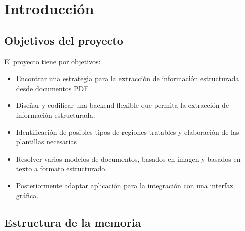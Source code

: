 
\chapter{Introducción}
\label{chap:introduccion}

\section{Objetivos del proyecto}

El proyecto tiene por objetivos:
\begin{itemize}
    \item Encontrar una estrategia para la extracción de información estructurada desde documentos PDF 
    \item Diseñar y codificar una backend flexible que permita la extracción de información estructurada.
    \item Identificación de posibles tipos de regiones tratables y elaboración de las plantillas necesarias
    \item Resolver varios modelos de documentos, basados en imagen y basados en texto a formato estructurado.
    \item Posteriormente adaptar aplicación para la integración con una interfaz gráfica.
\end{itemize}

\section{Estructura de la memoria}